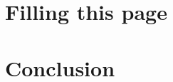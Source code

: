 \documentclass[journal, a4paper]{IEEEtran}
\begin{document}



\section{Filling this page}
\section{Conclusion}
\end{document}
